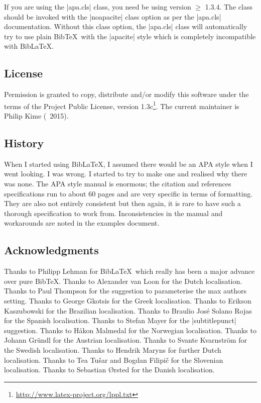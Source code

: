 \documentclass{ltxdockit}
\begin{document}
If you are using the |apa.cls| \latex class, you need be using version
$\geq$ 1.3.4. The class should be invoked with the |noapacite| class option
as per the |apa.cls| documentation. Without this class option, the
|apa.cls| class will automatically try to use plain Bib\TeX\ with the
|apacite| style which is completely incompatible with Bib\LaTeX.

\subsection{License}

Permission is granted to copy, distribute and/or modify this software under
the terms of the \latex Project Public License, version
1.3c\footnote{\url{http://www.latex-project.org/lppl.txt}}. The current
maintainer is Philip Kime (\textcopyright\ 2015).

\subsection{History}

When I started using Bib\LaTeX, I assumed there would be an APA style
when I went looking. I was wrong. I started to try to make one and realised
why there was none. The APA style manual is enormous; the citation and
references specifications run to about 60 pages and are very specific in
terms of formatting. They are also not entirely consistent but then again,
it is rare to have such a thorough specification to work from.
Inconsistencies in the manual and workarounds are noted in the examples
document.

\subsection{Acknowledgments}

Thanks to Philipp Lehman for Bib\LaTeX\ which really has been a major
advance over pure Bib\TeX. Thanks to Alexander van Loon for the Dutch
localisation. Thanks to Paul Thompson for the suggestion to
parameterise the max authors setting. Thanks to George Gkotsis for the
Greek localisation. Thanks to Erikson Kaszubowski for the Brazilian
localisation. Thanks to Braulio José Solano Rojas for the Spanish
localisation. Thanks to Stefan Mayer for the |subtitlepunct| suggestion.
Thanks to Håkon Malmedal for the Norwegian localisation. Thanks to
Johann Gründl for the Austrian localisation. Thanks to Svante Kvarnström
for the Swedish localisation. Thanks to Hendrik Maryns for further Dutch
localisation. Thanks to Tea Tušar and Bogdan Filipič for the Slovenian
localisation. Thanks to Sebastian Ørsted for the Danish localisation.
\end{document}
